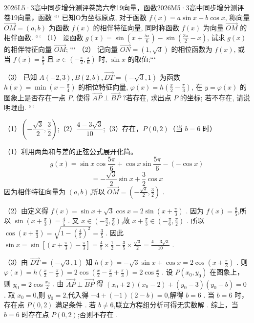 \documentclass[12pt,UTF-8,a4paper]{ctexart}
\numberwithin{figure}{section}
\theoremstyle{mystyle}
\theoremstyle{mystylekaishu}
\theoremstyle{mystyle}
\numberwithin{xiti}{section}
\begin{document}
\begin{problem}{2026}{L}{5·3高中同步增分测评卷第六章}{19}{向量，函数}{2026}{M}{5·3高中同步增分测评卷}{19}{向量，函数}
```
已知O为坐标原点, 对于函数 $f(x)=a \sin x+b \cos x$, 称向量 $\overrightarrow{O M}=(a, b)$ 为函数 $f(x)$ 的相伴特征向量, 同时称函数 $f(x)$ 为向量 $\overrightarrow{O M}$ 的相伴函数.
```
（1） 设函数 $g(x)=\sin \left(x+\frac{5 \pi}{6}\right)-\sin \left(\frac{3 \pi}{2}-x\right)$, 试求 $g(x)$ 的相伴特征向量 $\overrightarrow{O M}$;
```
（2） 记向量 $\overrightarrow{O N}=(1, \sqrt{3})$ 的相位函数为 $f(x)$, 或当 $f(x)=\frac{8}{5}$ 且 $x \in\left(-\frac{\pi}{2}, \frac{\pi}{6}\right)$ 时, $\sin x$ 的取值;```

（3） 已知 $A(-2,3), B(2, b), \overrightarrow{D T}=(-\sqrt{3}, 1)$ 为函数 $h(x)=\min \left(x-\frac{\pi}{4}\right)$ 的相位特征向量, $\varphi(x)=h\left(\frac{x}{2}-\frac{\pi}{3}\right)$, 在 $y=\varphi(x)$ 的图象上是否存在一点 $P$, 使得 $\overrightarrow{A P} \perp \overrightarrow{B P}$ ?若存在, 求出点 $P$ 的坐标; 若不存在, 请说明理由.
```
\end{problem}

\begin{answer}
（1）$\boxed{\left(-\dfrac{\sqrt{3}}{2}, \dfrac{3}{2}\right)}$;（2）$\boxed{\dfrac{4-3\sqrt{3}}{10}}$;（3）存在，$\boxed{P(0,2)}$（当 $b=6$ 时）
\end{answer}

\begin{solutions}
（1）利用两角和与差的正弦公式展开化简。
$$
g(x)=\sin x\cos\frac{5\pi}{6}+\cos x\sin\frac{5\pi}{6}-(-\cos x)
$$
$$
=-\frac{\sqrt{3}}{2}\sin x+\frac{3}{2}\cos x
$$
因为相伴特征向量为 $(a,b)$,所以 $\overrightarrow{OM}=\left(-\frac{\sqrt{3}}{2}, \frac{3}{2}\right)$ .

（2）由定义得 $f(x)=\sin x+\sqrt{3}\cos x=2\sin\left(x+\frac{\pi}{3}\right)$ .
因为 $f(x)=\frac{8}{5}$,所以 $\sin\left(x+\frac{\pi}{3}\right)=\frac{4}{5}$ .
又 $x\in\left(-\frac{\pi}{2}, \frac{\pi}{6}\right)$,故 $x+\frac{\pi}{3}\in\left(-\frac{\pi}{6}, \frac{\pi}{2}\right)$ .
所以 $\cos\left(x+\frac{\pi}{3}\right)=\sqrt{1-\left(\frac{4}{5}\right)^2}=\frac{3}{5}$ .
因此 $\sin x=\sin\left[\left(x+\frac{\pi}{3}\right)-\frac{\pi}{3}\right]=\frac{4}{5}\times\frac{1}{2}-\frac{3}{5}\times\frac{\sqrt{3}}{2}=\frac{4-3\sqrt{3}}{10}$ .

（3）由 $\overrightarrow{DT}=(-\sqrt{3},1)$ 知 $h(x)=-\sqrt{3}\sin x+\cos x=2\cos\left(x+\frac{\pi}{3}\right)$ .
则 $\varphi(x)=h\left(\frac{x}{2}-\frac{\pi}{3}\right)=2\cos\left(\frac{x}{2}-\frac{\pi}{3}+\frac{\pi}{3}\right)=2\cos\frac{x}{2}$ .
设 $P(x_0,y_0)$ 在图象上，则 $y_0=2\cos\frac{x_0}{2}$ .
由 $\overrightarrow{AP}\perp\overrightarrow{BP}$ 得 $(x_0+2)(x_0-2)+(y_0-3)(y_0-b)=0$ .
取 $x_0=0$,则 $y_0=2$,代入得 $-4+(-1)(2-b)=0$,解得 $b=6$ .
当 $b=6$ 时，存在点 $P(0,2)$ 满足条件 .
若 $b\neq 6$,联立方程组分析可得无实数解 .
综上，当 $b=6$ 时存在点 $P(0,2)$;否则不存在 .
\end{solutions}
\end{document}
